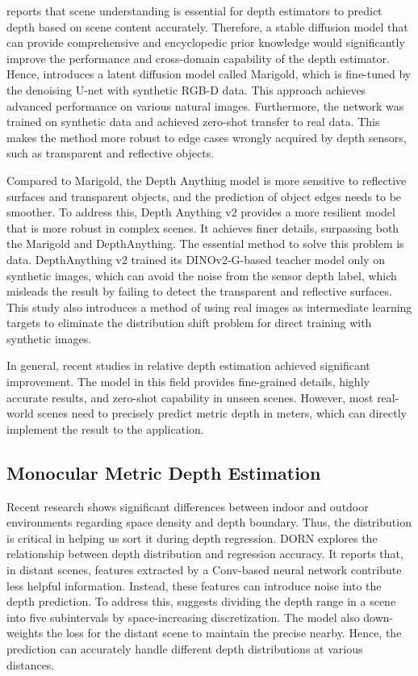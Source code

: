 \cite{Marigold} reports that scene understanding is essential for depth estimators to predict depth based on scene content accurately. Therefore, a stable diffusion model that can provide comprehensive and encyclopedic prior knowledge would significantly improve the performance and cross-domain capability of the depth estimator. Hence, \cite{Marigold} introduces a latent diffusion model called Marigold, which is fine-tuned by the denoising U-net with synthetic RGB-D data. This approach achieves advanced performance on various natural images. Furthermore, the network was trained on synthetic data and achieved zero-shot transfer to real data. This makes the method more robust to edge cases wrongly acquired by depth sensors, such as transparent and reflective objects.

Compared to Marigold, the Depth Anything model is more sensitive to reflective surfaces and transparent objects, and the prediction of object edges needs to be smoother. To address this, Depth Anything v2 \cite{depth_anything_v2} provides a more resilient model that is more robust in complex scenes. It achieves finer details, surpassing both the Marigold and DepthAnything. The essential method to solve this problem is data. DepthAnything v2 trained its DINOv2-G-based teacher model only on synthetic images, which can avoid the noise from the sensor depth label, which misleads the result by failing to detect the transparent and reflective surfaces. This study also introduces a method of using real images as intermediate learning targets to eliminate the distribution shift problem for direct training with synthetic images.

In general, recent studies in relative depth estimation achieved significant improvement. The model in this field provides fine-grained details, highly accurate results, and zero-shot capability in unseen scenes. However, most real-world scenes need to precisely predict metric depth in meters, which can directly implement the result to the application.
    
\subsection{Monocular Metric Depth Estimation}
Recent research shows significant differences between indoor and outdoor environments regarding space density and depth boundary. Thus, the distribution is critical in helping us sort it during depth regression. DORN \cite{FuCVPR18-DORN} explores the relationship between depth distribution and regression accuracy. It reports that, in distant scenes, features extracted by a Conv-based neural network contribute less helpful information. Instead, these features can introduce noise into the depth prediction.
To address this, \cite{FuCVPR18-DORN} suggests dividing the depth range in a scene into five subintervals by space-increasing discretization. The model also down-weights the loss for the distant scene to maintain the precise nearby. Hence, the prediction can accurately handle different depth distributions at various distances.

